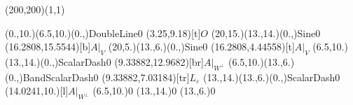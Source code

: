 \unitlength=1bp%

\begin{feynartspicture}(200,200)(1,1)

\FADiagram{}
\FAProp(0.,10.)(6.5,10.)(0.,){DoubleLine}{0}
\FALabel(3.25,9.18)[t]{$O$}
\FAProp(20,15.)(13.,14.)(0.,){Sine}{0}
\FALabel(16.2808,15.5544)[b]{$A|_V$}
\FAProp(20,5.)(13.,6.)(0.,){Sine}{0}
\FALabel(16.2808,4.44558)[t]{$A|_V$}
\FAProp(6.5,10.)(13.,14.)(0.,){ScalarDash}{0}
\FALabel(9.33882,12.9682)[br]{$A|_{W^\perp}$}
\FAProp(6.5,10.)(13.,6.)(0.,){BandScalarDash}{0}
\FALabel(9.33882,7.03184)[tr]{$L_\varepsilon$}
\FAProp(13.,14.)(13.,6.)(0.,){ScalarDash}{0}
\FALabel(14.0241,10.)[l]{$A|_{W^\perp}$}
\FAVert(6.5,10.){0}
\FAVert(13.,14.){0}
\FAVert(13.,6.){0}
\end{feynartspicture}

